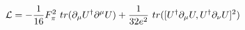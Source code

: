 \begin{equation}
{\cal{L}}=-\frac{1}{16} F_{\pi}^2 ~tr(\partial_\mu U^{\dag} \partial^{\mu} U) + \frac{1}{32e^2}~tr([U^{\dag} \partial_{\mu} U,U^{\dag} \partial_{\nu} U]^2)    \label{eq:1s}
\end{equation}

